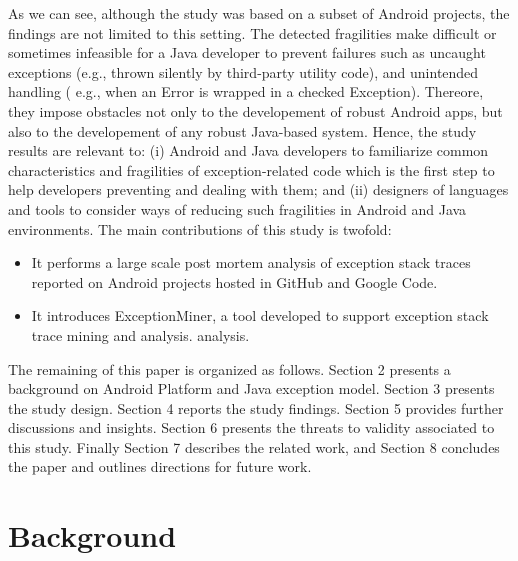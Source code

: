 \documentclass[conference]{IEEEtran}
\begin{document}
As we can see, although the study was based on a subset of Android projects, 
the findings are not limited to this setting. The detected fragilities make difficult
or sometimes infeasible for a Java developer to prevent failures such as 
uncaught exceptions (e.g., thrown silently by third-party utility code), and 
unintended handling ( e.g., when an Error is wrapped in a checked Exception).
Thereore, they impose obstacles not only to the developement of robust Android apps, 
but also to the developement of any robust Java-based system. 
Hence, the study results are relevant to: (i) Android and 
Java developers to familiarize common characteristics and fragilities of exception-related code 
which is the first step to help developers preventing and dealing with them; and (ii) designers of languages and tools 
to consider ways of reducing such fragilities in Android and Java environments.
The main contributions of this study is twofold:
\begin{itemize}

  \item  It performs a large scale post mortem analysis of exception stack traces reported on Android projects hosted in GitHub and Google Code.
  \item  It introduces ExceptionMiner, a tool developed to support exception stack trace mining and analysis.
    analysis.

\end{itemize}



The remaining of this paper is organized as follows. Section 2 presents a
background on Android Platform and Java exception model. 
Section 3 presents the study design. Section 4 reports the study findings. 
Section 5 provides further discussions and insights.
Section 6 presents the threats to validity associated to this study. Finally Section
7 describes the related work, and Section 8 concludes the paper and outlines
directions for future work.

\section{Background}
\label{sec:back}
\end{document}
